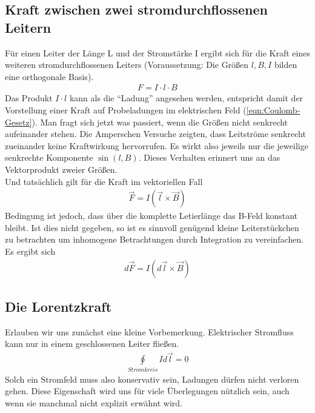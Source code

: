 \subsection{Kraft zwischen zwei stromdurchflossenen Leitern}
Für einen Leiter der Länge L und der Stromstärke I ergibt sich für die Kraft eines weiteren stromdurchflossenen Leiters (Voraussetzung: Die Größen $l,B,I$ bilden eine orthogonale Basis).
\begin{align} \label{eqn:KraftstromDruchfl}
F = I \cdot l \cdot B
\end{align} Das Produkt $I \cdot l$ kann als die "`Ladung"' angesehen werden, entspricht damit der Vorstellung einer Kraft auf  Probeladungen im elektrischen Feld (\ref{eqn:Coulomb-Gesetz}).
Man fragt sich jetzt was passiert, wenn die Größen nicht senkrecht aufeinander stehen. Die Amperschen Versuche zeigten, dass Leitströme senkrecht zueinander keine Kraftwirkung hervorrufen.
Es wirkt also jeweils nur die jeweilige senkrechte Komponente $\sin \left(l,B \right)$. Dieses Verhalten erinnert uns an das Vektorprodukt zweier Größen.
\\ Und tatsächlich gilt für die Kraft im vektoriellen Fall
\begin{align} \label{eqn:KRaftBFeld_vec}
\boxed{\vec{F} = I \left( \vec{l} \times \vec{B}\right)}
\end{align}
Bedingung ist jedoch, dass über die komplette Letierlänge das B-Feld konstant bleibt. Ist dies nicht gegeben, so ist es sinnvoll genügend kleine Leiterstückchen zu betrachten um inhomogene Betrachtungen durch Integration zu vereinfachen. Es ergibt sich
\begin{align} \label{eqn:KraftBFeld_infintesimal}
d\vec{F} = I \left( d\vec{l} \times \vec{B}\right)
\end{align}
\subsection{Die Lorentzkraft}
Erlauben wir uns zunächst eine kleine Vorbemerkung. Elektrischer Stromfluss kann nur in einem geschlossenen Leiter fließen.
\begin{align*}
\oint \limits_{Stromkreis} I d\vec{l} = 0
\end{align*} Solch ein Stromfeld muss also konservativ sein, Ladungen dürfen nicht verloren gehen. Diese Eigenschaft wird uns für viele Überlegungen nützlich sein, auch wenn sie manchmal nicht explizit erwähnt wird.

